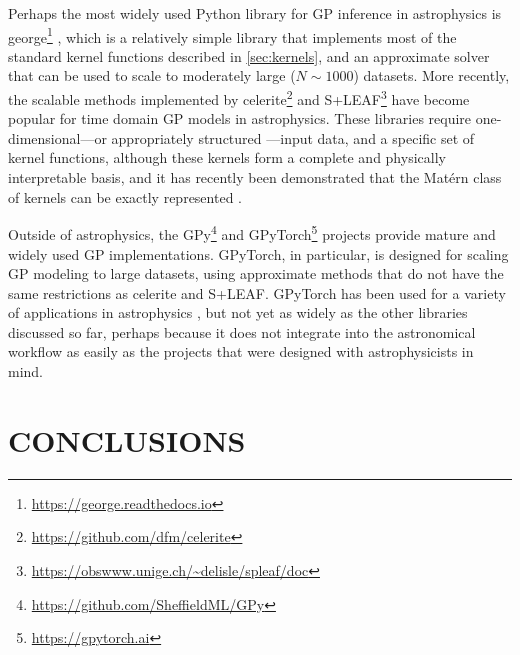 \documentclass[letterpaper]{ar-1col}
\newcommand{\project}[1]{\textsf{#1}}
\begin{document}
Perhaps the most widely used \project{Python} library for GP inference in astrophysics is \project{george}\footnote{\url{https://george.readthedocs.io}} \citep{george}, which is a relatively simple library that implements most of the standard kernel functions described in \autoref{sec:kernels}, and an approximate solver that can be used to scale to moderately large ($N \sim 1000$) datasets.
More recently, the scalable methods implemented by \project{celerite}\footnote{\url{https://github.com/dfm/celerite}} \citep{celerite} and \project{S+LEAF}\footnote{\url{https://obswww.unige.ch/~delisle/spleaf/doc}} \citep{2020A&A...638A..95D, 2022A&A...659A.182D} have become popular for time domain GP models in astrophysics.
These libraries require one-dimensional---or appropriately structured \citep{2020AJ....160..240G, 2022A&A...659A.182D}---input data, and a specific set of kernel functions, although these kernels form a complete \citep{JMLR:v22:21-0072} and physically interpretable \citep{celerite} basis, and it has recently been demonstrated that the Mat\'ern class of kernels can be exactly represented \citep{2021RNAAS...5..107J}.

Outside of astrophysics, the \project{GPy}\footnote{\url{https://github.com/SheffieldML/GPy}} and \project{GPyTorch}\footnote{\url{https://gpytorch.ai}} \citep{gpytorch} projects provide mature and widely used GP implementations.
\project{GPyTorch}, in particular, is designed for scaling GP modeling to large datasets, using approximate methods \citep[e.g.,][]{kissgp, 2015arXiv151101870W} that do not have the same restrictions as \project{celerite} and \project{S+LEAF}.
\project{GPyTorch} has been used for a variety of applications in astrophysics \citep[e.g.,][]{2022A&A...658A.166D, 2022MNRAS.511.5597L}, but not yet as widely as the other libraries discussed so far, perhaps because it does not integrate into the astronomical workflow as easily as the projects that were designed with astrophysicists in mind.

\section{CONCLUSIONS}
\label{sec:concl}
\end{document}
